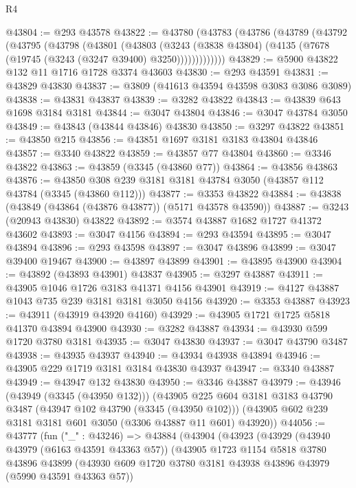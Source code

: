 \begin{lexlean}{R4}
\begin{coremodule}
@43804 := @293 @43578
@43822 := @43780
    (@43783
      (@43786
        (@43789
          (@43792
            (@43795
              (@43798
                (@43801
                  (@43803
                    (@3243
                      (@3838 @43804)
                      (@4135 (@7678 (@19745 (@3243 (@3247 @39400) @3250)))))))))))))
@43829 := @5900 @43822 @132 @11 @1716 @1728 @3374 @43603
@43830 := @293 @43591
@43831 := @43829 @43830
@43837 := @3809 (@41613 @43594 @43598 @3083 @3086 @3089)
@43838 := @43831 @43837
@43839 := @3282 @43822
@43843 := @43839 @643 @1698 @3184 @3181
@43844 := @3047 @43804
@43846 := @3047 @43784 @3050
@43849 := @43843 (@43844 @43846) @43830
@43850 := @3297 @43822
@43851 := @43850 @215
@43856 := @43851 @1697 @3181 @3183 @43804 @43846
@43857 := @3340 @43822
@43859 := @43857 @77 @43804
@43860 := @3346 @43822
@43863 := @43859 (@3345 (@43860 @77))
@43864 := @43856 @43863
@43876 := @43850 @308 @239 @3181 @3181 @43784 @3050 (@43857 @112 @43784 (@3345 (@43860 @112)))
@43877 := @3353 @43822
@43884 := @43838 (@43849 (@43864 (@43876 @43877)) (@5171 @43578 @43590))
@43887 := @3243 (@20943 @43830) @43822
@43892 := @3574 @43887 @1682 @1727 @41372 @43602
@43893 := @3047 @4156
@43894 := @293 @43594
@43895 := @3047 @43894
@43896 := @293 @43598
@43897 := @3047 @43896
@43899 := @3047 @39400 @19467
@43900 := @43897 @43899
@43901 := @43895 @43900
@43904 := @43892 (@43893 @43901) @43837
@43905 := @3297 @43887
@43911 := @43905 @1046 @1726 @3183 @41371 @4156 @43901
@43919 := @4127 @43887 @1043 @735 @239 @3181 @3181 @3050 @4156
@43920 := @3353 @43887
@43923 := @43911 (@43919 @43920 @4160)
@43929 := @43905 @1721 @1725 @5818 @41370 @43894 @43900
@43930 := @3282 @43887
@43934 := @43930 @599 @1720 @3780 @3181
@43935 := @3047 @43830
@43937 := @3047 @43790 @3487
@43938 := @43935 @43937
@43940 := @43934 @43938 @43894
@43946 := @43905 @229 @1719 @3181 @3184 @43830 @43937
@43947 := @3340 @43887
@43949 := @43947 @132 @43830
@43950 := @3346 @43887
@43979 := @43946
    (@43949 (@3345 (@43950 @132)))
    (@43905
      @225
      @604
      @3181
      @3183
      @43790
      @3487
      (@43947 @102 @43790 (@3345 (@43950 @102)))
      (@43905 @602 @239 @3181 @3181 @601 @3050 (@3306 @43887 @11 @601) @43920))
@44056 := @43777
    (fun ("_" : @43246) =>
    @43884
      (@43904
        (@43923
          (@43929
            (@43940 @43979 (@6163 @43591 @43363 @57))
            (@43905
              @1723
              @1154
              @5818
              @3780
              @43896
              @43899
              (@43930 @609 @1720 @3780 @3181 @43938 @43896 @43979 (@5990 @43591 @43363 @57))

\end{coremodule}
\end{lexlean}
